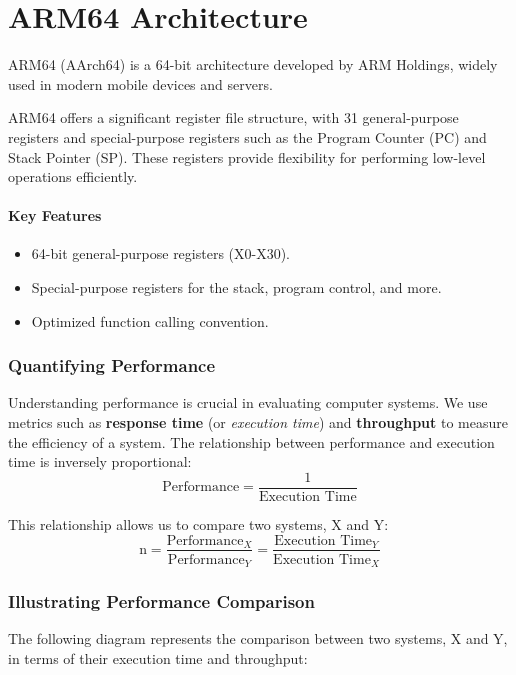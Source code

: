 \section{ARM64 Architecture}

ARM64 (AArch64) is a 64-bit architecture developed by ARM Holdings, widely used in modern mobile devices and servers.\par
ARM64 offers a significant register file structure, with 31 general-purpose registers and special-purpose registers such as the Program Counter (PC) and Stack Pointer (SP). These registers provide flexibility for performing low-level operations efficiently.

\paragraph{Key Features}
\begin{itemize}
	\item 64-bit general-purpose registers (X0-X30).
	\item Special-purpose registers for the stack, program control, and more.
	\item Optimized function calling convention.
\end{itemize}

\newpage

\newpage
\subsubsection{Quantifying Performance}

Understanding performance is crucial in evaluating computer systems. We use metrics such as \textbf{response time} (or \textit{execution time}) and \textbf{throughput} to measure the efficiency of a system. The relationship between performance and execution time is inversely proportional:
\[
\text{Performance} = \frac{1}{\text{Execution Time}}
\]

This relationship allows us to compare two systems, X and Y:
\[
\text{n} = \frac{\text{Performance}_X}{\text{Performance}_Y} = \frac{\text{Execution Time}_Y}{\text{Execution Time}_X}
\]

\subsubsection{Illustrating Performance Comparison}

The following diagram represents the comparison between two systems, X and Y, in terms of their execution time and throughput:

